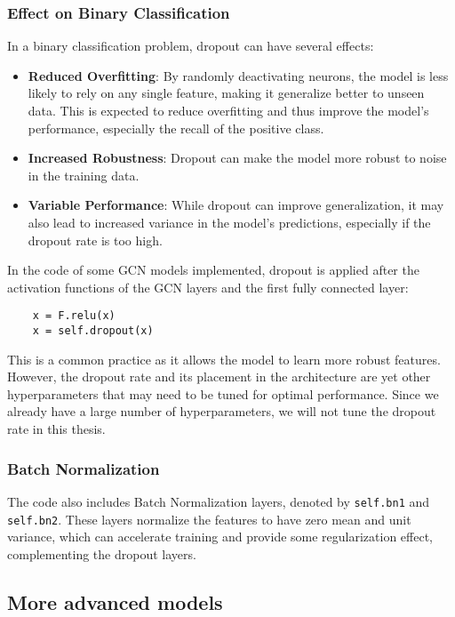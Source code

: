\subsubsection{Effect on Binary Classification}

In a binary classification problem, dropout can have several effects:

\begin{itemize}
    \item \textbf{Reduced Overfitting}: By randomly deactivating neurons, the model is less likely to rely on any single feature, making it generalize better to unseen data. This is expected to reduce overfitting and thus improve the model's performance, especially the recall of the positive class.
    \item \textbf{Increased Robustness}: Dropout can make the model more robust to noise in the training data.
    \item \textbf{Variable Performance}: While dropout can improve generalization, it may also lead to increased variance in the model's predictions, especially if the dropout rate is too high.
\end{itemize}

In the code of some GCN models implemented, dropout is applied after the activation functions of the GCN layers and the first fully connected layer:

\begin{verbatim}
    x = F.relu(x)
    x = self.dropout(x)
\end{verbatim}

This is a common practice as it allows the model to learn more robust features. However, the dropout rate and its placement in the architecture are yet other hyperparameters that may need to be tuned for optimal performance. Since we already have a large number of hyperparameters, we will not tune the dropout rate in this thesis.

\subsubsection{Batch Normalization}

The code also includes Batch Normalization layers, denoted by \texttt{self.bn1} and \texttt{self.bn2}. These layers normalize the features to have zero mean and unit variance, which can accelerate training and provide some regularization effect, complementing the dropout layers.

\subsection{More advanced models}

